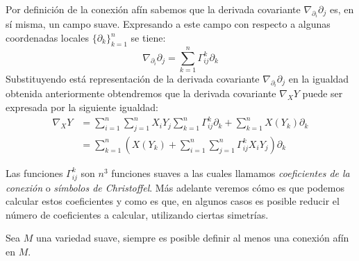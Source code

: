 Por definición de la conexión afín sabemos que la derivada covariante $\nabla_{\partial_{i}} \partial_{j}$ es, en sí misma, un campo suave. Expresando a este campo con respecto a algunas coordenadas locales $\{ \partial_{k} \}_{k=1}^{n}$ se tiene:
\[
	\nabla_{\partial_{i}}\partial_{j} = \sum_{k=1}^{n} \Gamma_{ij}^{k} \partial_{k}
\]
Substituyendo está representación de la derivada covariante $\nabla_{\partial_{i}}\partial_{j}$ en la igualdad obtenida anteriormente obtendremos que la derivada covariante $\nabla_{X}Y$ puede ser expresada por la siguiente igualdad:
\begin{align*}
	\nabla_{X}Y
	 & = \sum_{i=1}^{n}\sum_{j=1}^{n} X_{i}Y_{j} \sum_{k=1}^{n} \Gamma_{ij}^{k} \partial_{k} + \sum_{k=1}^{n} X(Y_{k})\partial_{k} \\
	 & = \sum_{k=1}^{n} \left( X(Y_{k}) + \sum_{i=1}^{n}\sum_{j=1}^{n} \Gamma_{ij}^{k} X_{i}Y_{j} \right) \partial_{k}
\end{align*}

Las funciones $\Gamma_{ij}^{k}$ son $n^{3}$ funciones suaves a las cuales llamamos \textit{coeficientes de la conexión} o \textit{símbolos de Christoffel}. Más adelante veremos cómo es que podemos calcular estos coeficientes y como es que, en algunos casos es posible reducir el número de coeficientes a calcular, utilizando ciertas simetrías.

\begin{theorem}
  Sea $M$ una variedad suave, siempre es posible definir al menos una conexión afín en $M$.
\end{theorem}

